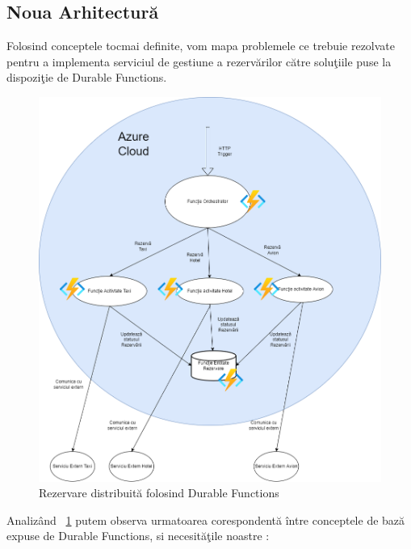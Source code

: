 \documentclass[a4paper,12pt]{report}
\begin{document}
\subsection{Noua Arhitectură}
\par Folosind conceptele tocmai definite, vom mapa problemele ce trebuie rezolvate pentru a implementa serviciul de gestiune a rezervărilor către soluţiile puse la dispoziţie de Durable Functions. 
 \begin{figure}[h]
\begin{center}
        \includegraphics[width=1\textwidth]{images/durable_functions_arhitecture}
			 \caption{Rezervare distribuită folosind Durable Functions}
			 \label{fig:durable-functions-booking-arhitecture}
\end{center}
\end{figure}
 \par Analizând ~\ref{fig:durable-functions-booking-arhitecture} putem observa urmatoarea corespondentă între conceptele de bază expuse de Durable Functions, si necesităţile noastre : 
\end{document}
